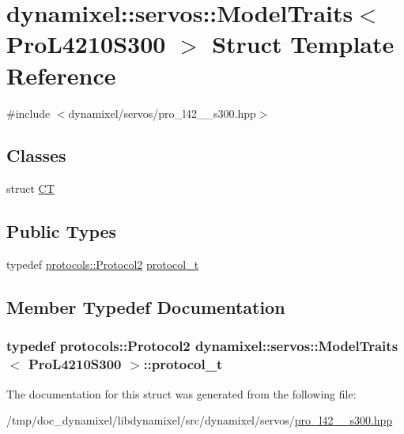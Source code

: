 \hypertarget{structdynamixel_1_1servos_1_1_model_traits_3_01_pro_l4210_s300_01_4}{}\section{dynamixel\+:\+:servos\+:\+:Model\+Traits$<$ Pro\+L4210\+S300 $>$ Struct Template Reference}
\label{structdynamixel_1_1servos_1_1_model_traits_3_01_pro_l4210_s300_01_4}


{\ttfamily \#include $<$dynamixel/servos/pro\+\_\+l42\+\_\+\_\+s300.\+hpp$>$}

\subsection*{Classes}
\begin{DoxyCompactItemize}
\item 
struct \hyperlink{structdynamixel_1_1servos_1_1_model_traits_3_01_pro_l4210_s300_01_4_1_1_c_t}{CT}
\end{DoxyCompactItemize}
\subsection*{Public Types}
\begin{DoxyCompactItemize}
\item 
typedef \hyperlink{classdynamixel_1_1protocols_1_1_protocol2}{protocols\+::\+Protocol2} \hyperlink{structdynamixel_1_1servos_1_1_model_traits_3_01_pro_l4210_s300_01_4_add139e0a0dc53ef8abea510189b32740}{protocol\+\_\+t}
\end{DoxyCompactItemize}


\subsection{Member Typedef Documentation}
\subsubsection[{\texorpdfstring{protocol\+\_\+t}{protocol_t}}]{\setlength{\rightskip}{0pt plus 5cm}typedef {\bf protocols\+::\+Protocol2} {\bf dynamixel\+::servos\+::\+Model\+Traits}$<$ {\bf Pro\+L4210\+S300} $>$\+::{\bf protocol\+\_\+t}}\hypertarget{structdynamixel_1_1servos_1_1_model_traits_3_01_pro_l4210_s300_01_4_add139e0a0dc53ef8abea510189b32740}{}\label{structdynamixel_1_1servos_1_1_model_traits_3_01_pro_l4210_s300_01_4_add139e0a0dc53ef8abea510189b32740}


The documentation for this struct was generated from the following file\+:\begin{DoxyCompactItemize}
\item 
/tmp/doc\+\_\+dynamixel/libdynamixel/src/dynamixel/servos/\hyperlink{pro__l42__10__s300_8hpp}{pro\+\_\+l42\+\_\+\_\+s300.\+hpp}\end{DoxyCompactItemize}
